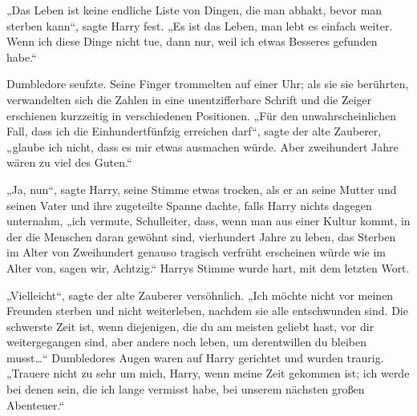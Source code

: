 „Das Leben ist keine endliche Liste von Dingen, die man abhakt, bevor man sterben kann“, sagte Harry fest. „Es ist das Leben, man lebt es einfach weiter. Wenn ich diese Dinge nicht tue, dann nur, weil ich etwas Besseres gefunden habe.“

Dumbledore seufzte. Seine Finger trommelten auf einer Uhr; als sie sie berührten, verwandelten sich die Zahlen in eine unentzifferbare Schrift und die Zeiger erschienen kurzzeitig in verschiedenen Positionen. „Für den unwahrscheinlichen Fall, dass ich die Einhundertfünfzig erreichen darf“, sagte der alte Zauberer, „glaube ich nicht, dass es mir etwas ausmachen würde. Aber zweihundert Jahre wären zu viel des Guten.“

„Ja, nun“, sagte Harry, seine Stimme etwas trocken, als er an seine Mutter und seinen Vater und ihre zugeteilte Spanne dachte, falls Harry nichts dagegen unternahm, „ich vermute, Schulleiter, dass, wenn man aus einer Kultur kommt, in der die Menschen daran gewöhnt sind, vierhundert Jahre zu leben, das Sterben im Alter von Zweihundert genauso tragisch verfrüht erscheinen würde wie im Alter von, sagen wir, Achtzig.“ Harrys Stimme wurde hart, mit dem letzten Wort.

„Vielleicht“, sagte der alte Zauberer versöhnlich. „Ich möchte nicht vor meinen Freunden sterben und nicht weiterleben, nachdem sie alle entschwunden sind. Die schwerste Zeit ist, wenn diejenigen, die du am meisten geliebt hast, vor dir weitergegangen sind, aber andere noch leben, um derentwillen du bleiben musst…“ Dumbledores Augen waren auf Harry gerichtet und wurden traurig. „Trauere nicht zu sehr um mich, Harry, wenn meine Zeit gekommen ist; ich werde bei denen sein, die ich lange vermisst habe, bei unserem nächsten großen Abenteuer.“

